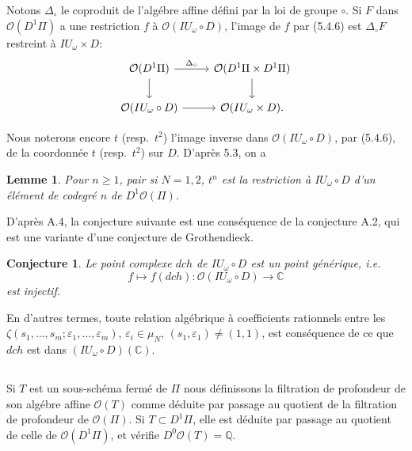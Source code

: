 \documentclass[11pt,a4paper]{article}
\theoremstyle{plain}
\newtheorem{lemma}[theorem]{Lemme}
\newtheorem{conjecture}[theorem]{Conjecture}
\theoremstyle{definition}
\newcommand{\dch}{\mathit{dch}}
\newcommand{\Q}{\mathbb{Q}}
\newcommand{\C}{\mathbb{C}}
\begin{document}
Notons $\Delta_\circ$ le coproduit de l'alg\'ebre affine d\'efini par la loi de groupe $\circ$. Si $F$ dans $\mathcal{O}(D^1\Pi)$ a une restriction $f$ \`a $\mathcal{O}(IU_\omega \circ D)$, l'image de $f$ par (5.4.6) est $\Delta_\circ F$ restreint \`a $IU_\omega \times D$:
\begin{equation}\label{eq:5.4.7}
\begin{tikzcd}
\mathcal{O}(D^1\Pi) \arrow{r}{\Delta_\circ} \arrow{d} & \mathcal{O}(D^1\Pi \times D^1\Pi) \arrow{d} \\
\mathcal{O}(IU_\omega \circ D) \arrow{r} & \mathcal{O}(IU_\omega \times D).
\end{tikzcd}
\end{equation}

Nous noterons encore $t$ (resp.~$t^2$) l'image inverse dans $\mathcal{O}(IU_\omega \circ D)$, par (5.4.6), de la coordonn\'ee $t$ (resp.~$t^2$) sur $D$. D'apr\`es 5.3, on a

\begin{lemma}\label{lem:5.5}
Pour $n \geq 1$, pair si $N=1,2$, $t^n$ est la restriction \`a $IU_\omega \circ D$ d'un \'el\'ement de codegr\'e $n$ de $D^1\mathcal{O}(\Pi)$.
\end{lemma}

D'apr\`es A.4, la conjecture suivante est une cons\'equence de la conjecture A.2, qui est une variante d'une conjecture de Grothendieck.

\begin{conjecture}\label{conj:5.6}
Le point complexe $\dch$ de $IU_\omega \circ D$ est un point g\'en\'erique, i.e.
\begin{equation}\label{eq:5.6.1}
f \mapsto f(\dch): \mathcal{O}(IU_\omega \circ D) \to \C
\end{equation}
est injectif.
\end{conjecture}

En d'autres termes, toute relation alg\'ebrique \`a coefficients rationnels entre les $\zeta(s_1,\ldots,s_m; \varepsilon_1,\ldots,\varepsilon_m)$, $\varepsilon_i \in \mu_N$, $(s_1, \varepsilon_1) \neq (1,1)$, est cons\'equence de ce que $\dch$ est dans $(IU_\omega \circ D)(\C)$.

\subsection{}
Si $T$ est un sous-sch\'ema ferm\'e de $\Pi$ nous d\'efinissons la filtration de profondeur de son alg\'ebre affine $\mathcal{O}(T)$ comme d\'eduite par passage au quotient de la filtration de profondeur de $\mathcal{O}(\Pi)$. Si $T \subset D^1\Pi$, elle est d\'eduite par passage au quotient de celle de $\mathcal{O}(D^1\Pi)$, et v\'erifie $D^0\mathcal{O}(T) = \Q$.
\end{document}
